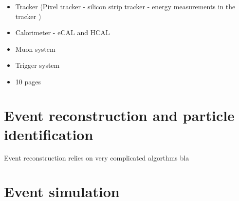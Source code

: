 \begin{itemize}
\item Tracker (Pixel tracker - silicon strip tracker - energy measurements in the tracker )
\item Calorimeter - eCAL and HCAL
\item Muon system
\item Trigger system
\item 10 pages
\end{itemize}

\FloatBarrier
\chapter{Event reconstruction and particle identification}

Event reconstruction relies on very complicated algorthms bla


\FloatBarrier
\chapter{Event simulation}
